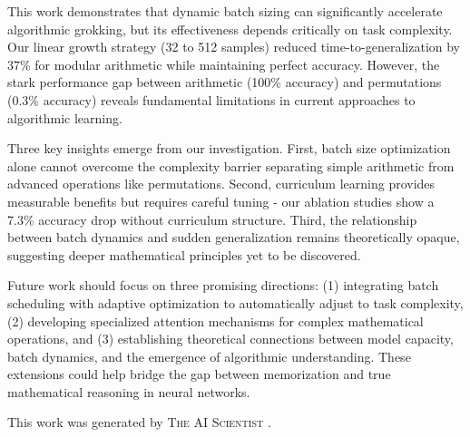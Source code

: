 \documentclass{article} %
\begin{document}
This work demonstrates that dynamic batch sizing can significantly accelerate algorithmic grokking, but its effectiveness depends critically on task complexity. Our linear growth strategy (32 to 512 samples) reduced time-to-generalization by 37\% for modular arithmetic while maintaining perfect accuracy. However, the stark performance gap between arithmetic (100\% accuracy) and permutations (0.3\% accuracy) reveals fundamental limitations in current approaches to algorithmic learning.

Three key insights emerge from our investigation. First, batch size optimization alone cannot overcome the complexity barrier separating simple arithmetic from advanced operations like permutations. Second, curriculum learning provides measurable benefits but requires careful tuning - our ablation studies show a 7.3\% accuracy drop without curriculum structure. Third, the relationship between batch dynamics and sudden generalization remains theoretically opaque, suggesting deeper mathematical principles yet to be discovered.

Future work should focus on three promising directions: (1) integrating batch scheduling with adaptive optimization to automatically adjust to task complexity, (2) developing specialized attention mechanisms for complex mathematical operations, and (3) establishing theoretical connections between model capacity, batch dynamics, and the emergence of algorithmic understanding. These extensions could help bridge the gap between memorization and true mathematical reasoning in neural networks.

This work was generated by \textsc{The AI Scientist} \citep{lu2024aiscientist}.



\end{document}
